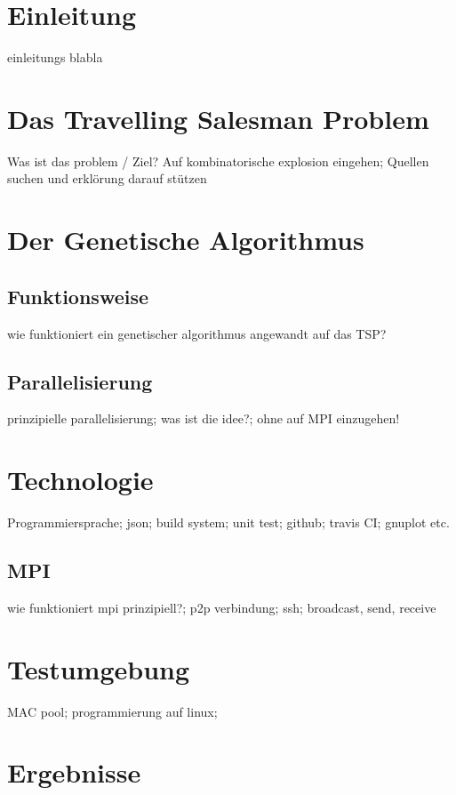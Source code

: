 \documentclass[12pt,a4paper]{scrreprt}
\begin{document}


\tableofcontents

\setlength{\parindent}{0pt}

\chapter{Einleitung}
\label{chap:einleitung}

einleitungs blabla

\chapter{Das Travelling Salesman Problem}
\label{chap:tsp}

Was ist das problem / Ziel? Auf kombinatorische explosion eingehen; Quellen suchen und erklörung darauf stützen

\chapter{Der Genetische Algorithmus}
\label{chap:algorithmus}

\section{Funktionsweise}
\label{sec:funktionsweise}

wie funktioniert ein genetischer algorithmus angewandt auf das TSP?

\section{Parallelisierung}
\label{sec:parallelisierung}

prinzipielle parallelisierung; was ist die idee?; ohne auf MPI einzugehen!

\chapter{Technologie}
\label{chap:technologie}

Programmiersprache; json; build system; unit test; github; travis CI; gnuplot etc.

\section{MPI}
\label{sec:mpi}

wie funktioniert mpi prinzipiell?; p2p verbindung; ssh; broadcast, send, receive 

\chapter{Testumgebung}
\label{chap:testumgebung}

MAC pool; programmierung auf linux;

\chapter{Ergebnisse}
\label{chap:ergebnisse}

\clearpage
{}
\lstlistoflistings
{}
\listoffigures
\listoftables


\end{document}
